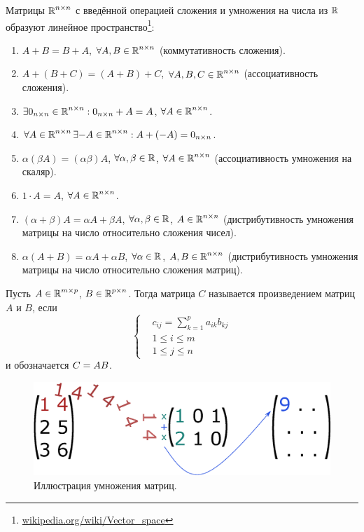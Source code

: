 \documentclass[a4paper,12pt]{article}
\begin{document}
  \begin{remark}
    Матрицы $\operatorname{\mathbb R}^{n \times n}$ с введённой операцией сложения и умножения на числа из $\operatorname{\mathbb R}$ образуют линейное пространство\footnote{\href{https://en.wikipedia.org/wiki/Vector\_space}{wikipedia.org/wiki/Vector\_space}}:
    \begin{enumerate}
      \item $A + B = B + A$, $\forall A, B \in \operatorname{\mathbb R}^{n \times n}$ (коммутативность сложения).
      \item $A + (B + C) = (A + B) + C$, $\forall A, B, C \in \operatorname{\mathbb R}^{n \times n}$ (ассоциативность сложения).
      \item $\exists 0_{n\times n} \in \operatorname{\mathbb R}^{n \times n}: 0_{n\times n} + A = A$, $\forall A \hm\in \RR^{n \times n}$.
      \item $\forall A \in \operatorname{\mathbb R}^{n \times n} \exists {-A} \in \operatorname{\mathbb R}^{n \times n}: A + ({-A}) = 0_{n\times n}$.
      \item $\alpha (\beta A) = (\alpha \beta) A$, $\forall \alpha, \beta \in \operatorname{\mathbb R}$, $\forall A \hm\in \RR^{n \times n}$ (ассоциативность умножения на скаляр).
      \item $1 \cdot A = A$, $\forall A \in \operatorname{\mathbb R}^{n \times n}$.
      \item $(\alpha + \beta) A = \alpha A + \beta A$, $\forall \alpha, \beta \hm\in \RR$, $A \hm\in \RR^{n \times n}$ (дистрибутивность умножения матрицы на число относительно сложения чисел).
      \item $\alpha (A + B) = \alpha A + \alpha B$, $\forall \alpha \hm\in \RR$, $A, B \hm\in \RR^{n \times n}$ (дистрибутивность умножения матрицы на число относительно сложения матриц).
    \end{enumerate}
  \end{remark}
  
  \begin{definition}
    Пусть $A \hm\in \RR^{m \times p}$, $B \hm\in \RR^{p \times n}$.
    Тогда матрица $C$ называется произведением матриц $A$ и $B$, если
    \[
      \left\{
        \begin{aligned}
          &c_{ij} = \sum_{k = 1}^p a_{ik} b_{kj}\\
          &1 \leq i \leq m\\
          &1 \leq j \leq n
        \end{aligned}
      \right.
    \]
    и обозначается $C \hm= AB$.
  \end{definition}

  \begin{figure}[h]
    \centering
    
    \includegraphics[width=0.5\columnwidth]{matrix-multiplication}
    
    \caption{Иллюстрация умножения матриц.}
    \label{fig:matrix-multiplication}
  \end{figure}
  
\end{document}
